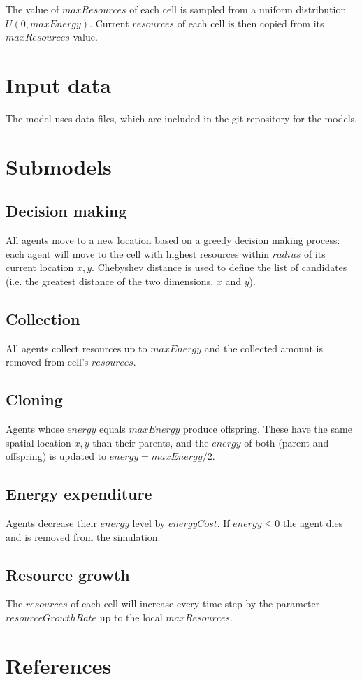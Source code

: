 \documentclass[11pt,a4paper,twocolumn,notitlepage]{article}
\begin{document}
The value of $maxResources$ of each cell is sampled from a uniform distribution $U(0,maxEnergy)$. Current $resources$ of each cell is then copied from its $maxResources$ value.

\section{Input data}

The model uses data files, which are included in the git repository for the models.

\section{Submodels}

\subsection{Decision making}

All agents move to a new location based on a greedy decision making process: each agent will move to the cell with highest resources within $radius$ of its current location $x,y$. Chebyshev distance is used to define the list of candidates (i.e. the greatest distance of the two dimensions, $x$ and $y$). %

\subsection{Collection}

All agents collect resources up to $maxEnergy$ and the collected amount is removed from cell's $resources$. 

\subsection{Cloning}

Agents whose $energy$ equals $maxEnergy$ produce offspring. These have the same spatial location $x,y$ than their parents, and the $energy$ of both (parent and offspring) is updated to $energy = maxEnergy/2$.

\subsection{Energy expenditure}

Agents decrease their $energy$ level by $energyCost$. If $energy \leq 0$ the agent dies and is removed from the simulation.

\subsection{Resource growth}

The $resources$ of each cell will increase every time step by the parameter $resourceGrowthRate$ up to the local $maxResources$.

\section{References}


\end{document}
